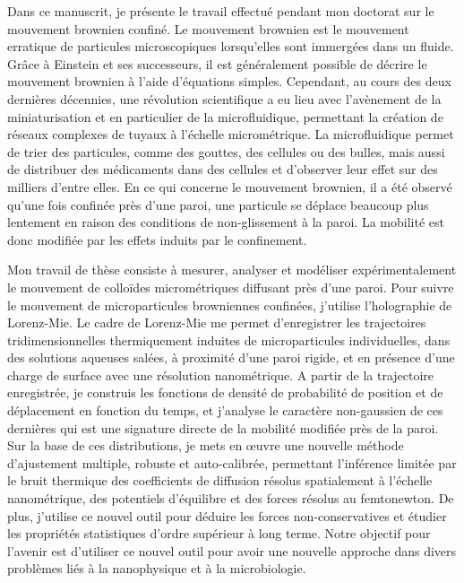 Dans ce manuscrit, je présente le travail effectué pendant mon doctorat sur le mouvement brownien confiné. Le mouvement brownien est le mouvement erratique de particules microscopiques lorsqu'elles sont immergées dans un fluide. Grâce à Einstein et ses successeurs, il est généralement possible de décrire le mouvement brownien à l'aide d'équations simples. Cependant, au cours des deux dernières décennies, une révolution scientifique a eu lieu avec l'avènement de la miniaturisation et en particulier de la microfluidique, permettant la création de réseaux complexes de tuyaux à l'échelle micrométrique. La microfluidique permet de trier des particules, comme des gouttes, des cellules ou des bulles, mais aussi de distribuer des médicaments dans des cellules et d'observer leur effet sur des milliers d'entre elles. En ce qui concerne le mouvement brownien, il a été observé qu'une fois confinée près d'une paroi, une particule se déplace beaucoup plus lentement en raison des conditions de non-glissement à la paroi. La mobilité est donc modifiée par les effets induits par le confinement.

Mon travail de thèse consiste à mesurer, analyser et modéliser expérimentalement le mouvement de colloïdes micrométriques diffusant près d'une paroi. Pour suivre le mouvement de microparticules browniennes confinées, j'utilise l'holographie de Lorenz-Mie. Le cadre de Lorenz-Mie me permet d'enregistrer les trajectoires tridimensionnelles thermiquement induites de microparticules individuelles, dans des solutions aqueuses salées, à proximité d'une paroi rigide, et en présence d'une charge de surface avec une résolution nanométrique. A partir de la trajectoire enregistrée, je construis les fonctions de densité de probabilité de position et de déplacement en fonction du temps, et j'analyse le caractère non-gaussien de ces dernières qui est une signature directe de la mobilité modifiée près de la paroi. Sur la base de ces distributions, je mets en œuvre une nouvelle méthode d'ajustement multiple, robuste et auto-calibrée, permettant l'inférence limitée par le bruit thermique des coefficients de diffusion résolus spatialement à l'échelle nanométrique, des potentiels d'équilibre et des forces résolus au femtonewton. De plus, j'utilise ce nouvel outil pour déduire les forces non-conservatives et étudier les propriétés statistiques d'ordre supérieur à long terme. Notre objectif pour l'avenir est d'utiliser ce nouvel outil pour avoir une nouvelle approche dans divers problèmes liés à la nanophysique et à la microbiologie.



